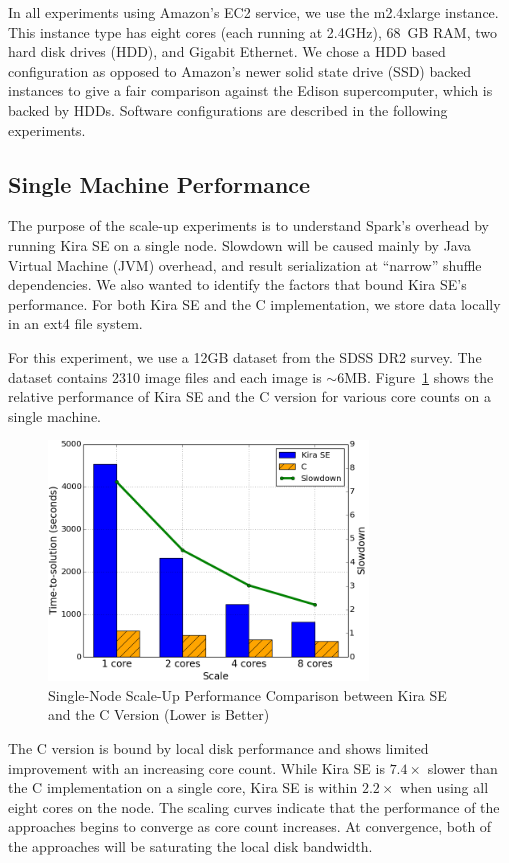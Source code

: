 \documentclass[10pt, conference, compsocconf]{IEEEtran}
\newcommand{\up}{\vspace*{-1em}}
\begin{document}
In all experiments using Amazon's EC2 service, we use the m2.4xlarge instance.
This instance type has eight cores (each running at 2.4GHz), 68~GB RAM, two hard disk drives (HDD), and Gigabit Ethernet. 
We chose a HDD based configuration as opposed to Amazon's newer solid state drive (SSD) backed instances to give a fair comparison
against the Edison supercomputer, which is backed by HDDs. 
Software configurations are described in the following experiments.

\subsection{Single Machine Performance}
\label{sec:Performance-scaleup}

The purpose of the scale-up experiments is to understand Spark's overhead by running
Kira SE on a single node. Slowdown will be caused mainly by Java Virtual Machine (JVM) overhead, and result
serialization at ``narrow'' shuffle dependencies. We also wanted to identify the factors
that bound Kira SE's performance. For both Kira SE and the C implementation, we store data
locally in an ext4 file system.

For this experiment, we use a 12GB dataset from the SDSS DR2 survey. The dataset contains
2310 image files and each image is $\sim$6MB.
Figure~\ref{fig:scaleup} shows the relative
performance of Kira SE and the C version for various core counts on a single machine.

\begin{figure}[h]
	\begin{center}
		\includegraphics[width=85mm]{pictures/scaleup}
		\caption{Single-Node Scale-Up Performance Comparison between Kira SE and the C Version (Lower is Better)
		\label{fig:scaleup}}
		\up
  	\end{center}
\end{figure}

The C version is bound by local disk performance and shows limited improvement with
an increasing core count. While Kira SE is $7.4\times$ slower than the C implementation
on a single core, Kira SE is within $2.2\times$ when using all eight cores on the node.
The scaling curves indicate that the performance of the approaches begins to converge
as core count increases. At convergence, both of the approaches will be saturating the local
disk bandwidth.
\end{document}
